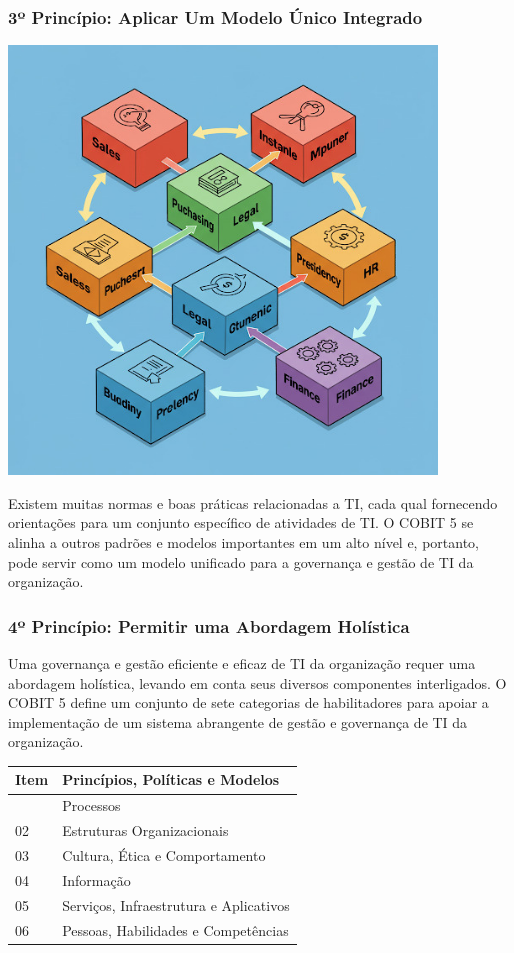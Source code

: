 \documentclass[
]{book}
\begin{document}
\subsubsection{3º Princípio: Aplicar Um Modelo Único Integrado}\label{uxba-princuxedpio-aplicar-um-modelo-uxfanico-integrado}

\includegraphics[width=4.47917in,height=\textheight]{images/cobit/05-principio-03-cobit.jpg}

Existem muitas normas e boas práticas relacionadas a TI, cada qual fornecendo orientações para um conjunto específico de atividades de TI. O COBIT 5 se alinha a outros padrões e modelos importantes em um alto nível e, portanto, pode servir como um modelo unificado para a governança e gestão de TI da organização.

\subsubsection{4º Princípio: Permitir uma Abordagem Holística}\label{uxba-princuxedpio-permitir-uma-abordagem-holuxedstica}

Uma governança e gestão eficiente e eficaz de TI da organização requer uma abordagem holística, levando em conta seus diversos componentes interligados. O COBIT 5 define um conjunto de sete categorias de habilitadores para apoiar a implementação de um sistema abrangente de gestão e governança de TI da organização.

\begin{longtable}[]{@{}ll@{}}
\toprule\noalign{}
Item & Princípios, Políticas e Modelos \\
\midrule\noalign{}
\endhead
\bottomrule\noalign{}
\endlastfoot
01 & Processos \\
02 & Estruturas Organizacionais \\
03 & Cultura, Ética e Comportamento \\
04 & Informação \\
05 & Serviços, Infraestrutura e Aplicativos \\
06 & Pessoas, Habilidades e Competências \\
\end{longtable}
\end{document}
